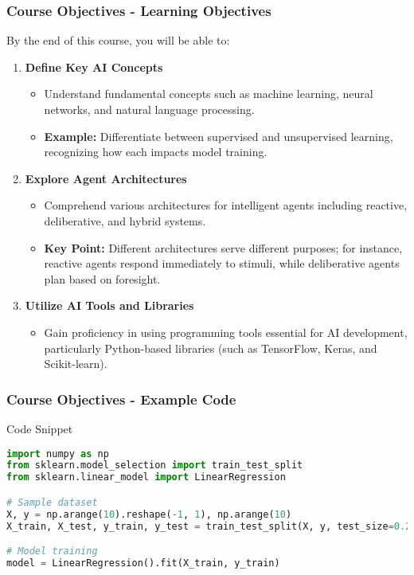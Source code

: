 \documentclass[aspectratio=169]{beamer}
\begin{document}
\begin{frame}
    \frametitle{Course Objectives - Learning Objectives}
    By the end of this course, you will be able to:
    \begin{enumerate}
        \item \textbf{Define Key AI Concepts}
        \begin{itemize}
            \item Understand fundamental concepts such as machine learning, neural networks, and natural language processing.
            \item \textbf{Example:} Differentiate between supervised and unsupervised learning, recognizing how each impacts model training.
        \end{itemize}
        
        \item \textbf{Explore Agent Architectures}
        \begin{itemize}
            \item Comprehend various architectures for intelligent agents including reactive, deliberative, and hybrid systems.
            \item \textbf{Key Point:} Different architectures serve different purposes; for instance, reactive agents respond immediately to stimuli, while deliberative agents plan based on foresight.
        \end{itemize}
        
        \item \textbf{Utilize AI Tools and Libraries}
        \begin{itemize}
            \item Gain proficiency in using programming tools essential for AI development, particularly Python-based libraries (such as TensorFlow, Keras, and Scikit-learn).
        \end{itemize}
    \end{enumerate}
\end{frame}

\begin{frame}[fragile]
    \frametitle{Course Objectives - Example Code}
    \begin{block}{Code Snippet}
    \begin{lstlisting}[language=Python]
import numpy as np
from sklearn.model_selection import train_test_split
from sklearn.linear_model import LinearRegression

# Sample dataset
X, y = np.arange(10).reshape(-1, 1), np.arange(10)
X_train, X_test, y_train, y_test = train_test_split(X, y, test_size=0.2)

# Model training
model = LinearRegression().fit(X_train, y_train)
    \end{lstlisting}
    \end{block}
\end{frame}
\end{document}
